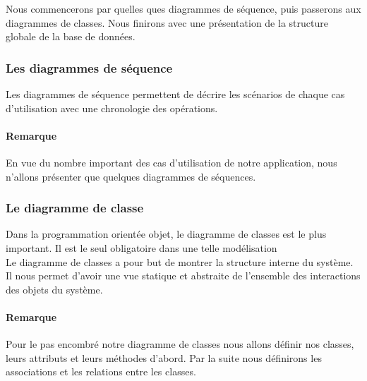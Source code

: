 Nous commencerons par quelles ques diagrammes de séquence, puis passerons aux diagrammes de classes. Nous finirons avec une présentation de la structure globale de la base de données.\\

\subsubsection{Les diagrammes de séquence}
Les diagrammes de séquence permettent de décrire les scénarios de chaque cas d'utilisation avec une chronologie des opérations.

\paragraph*{Remarque} En vue du nombre important des cas d'utilisation de notre application, nous n'allons présenter que quelques diagrammes de séquences.\\

\subsubsection{Le diagramme de classe}
Dans la programmation orientée objet, le diagramme de classes est le plus important. Il est le seul obligatoire dans une telle modélisation\\

Le diagramme de classes a pour but de montrer la structure interne du système. Il nous permet d'avoir une vue statique et abstraite de l'ensemble des interactions des objets du système.\\

\paragraph*{Remarque} Pour le pas encombré notre diagramme de classes nous allons définir nos classes, leurs attributs et leurs méthodes d'abord. Par la suite nous définirons les associations et les relations entre les classes.\\



